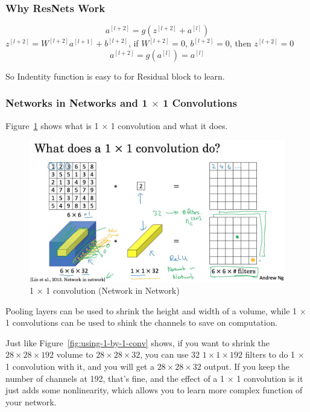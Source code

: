 \documentclass[UTF8]{article}
\newcommand{\Vector}[1]{\boldsymbol{\mathit{#1}}}   %
\newcommand{\Matrix}[1]{\boldsymbol{\mathit{#1}}}   %
\begin{document}
\subsubsection{Why ResNets Work}
$$ \Vector{a}^{[l+2]} = g(\Vector{z^{[l+2]}} + \Vector{a}^{[l]}) $$
$\Vector{z}^{[l+2]} = \Matrix{W}^{[l+2]} \Vector{a}^{[l+1]} + \Vector{b}^{[l+2]}$,
if $\Matrix{W}^{[l+2]} = 0$, $\Vector{b}^{[l+2]} = 0$, then $\Vector{z^{[l+2]}} = 0$
$$ \Vector{a}^{[l+2]} = g(\Vector{a}^{[l]}) = \Vector{a}^{[l]} $$

So Indentity function is easy to for Residual block to learn.

\subsubsection{Networks in Networks and 1 $\times$ 1 Convolutions}
Figure~\ref{fig:network-in-network} shows what is 1 $\times$ 1 convolution and what it does.

\begin{figure}[htb]
    \centering
    \includegraphics[width=40em]{figures/network-in-network}
    \caption{1 $\times$ 1 convolution (Network in Network)}
    \label{fig:network-in-network}
\end{figure}

Pooling layers can be used to shrink the height and width of a volume, while 1 $\times$
1 convolutions can be used to shink the channels to save on computation.

Just like Figure~\ref{fig:using-1-by-1-conv} shows, if you want to shrink the $28 \times 28 \times
192$ volume to $28 \times 28 \times 32$, you can use 32 $1 \times 1 \times 192$ filters to do 1
$\times$ 1 convolution with it, and you will get a $28 \times 28 \times 32$ output. If you keep the
number of channels at 192, that's fine, and the effect of a 1 $\times$ 1 convolution is it just
adds some nonlinearity, which allows you to learn more complex function of your network.
\end{document}
